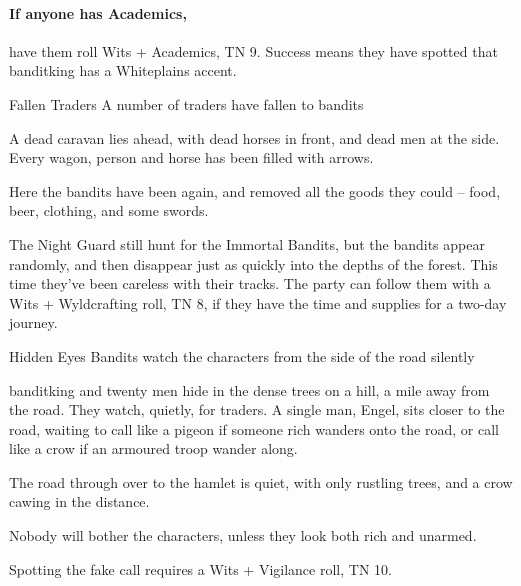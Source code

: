 \begin{multicols}{2}
\paragraph{If anyone has Academics,}
have them roll Wits + Academics, TN 9.
Success means they have spotted that \gls{banditking} has a Whiteplains accent.


\banditking


{Fallen Traders}%
{A number of traders have fallen to bandits}%

\begin{boxtext}

	A dead caravan lies ahead, with dead horses in front, and dead men at the side.  Every wagon, person and horse has been filled with arrows.

\end{boxtext}

Here the bandits have been again, and removed all the goods they could -- food, beer, clothing, and some swords.

The Night Guard still hunt for the Immortal Bandits, but the bandits appear randomly, and then disappear just as quickly into the depths of the forest.
This time they've been careless with their tracks.
The party can follow them with a Wits + Wyldcrafting roll, TN 8, if they have the time and supplies for a two-day journey.

{Hidden Eyes}%
{Bandits watch the characters from the side of the road silently}%

\gls{banditking} and twenty men hide in the dense trees on a hill, a mile away from the road.
They watch, quietly, for traders.
A single man, Engel, sits closer to the road, waiting to call like a pigeon if someone rich wanders onto the road, or call like a crow if an armoured troop wander along.

\begin{boxtext}

	The road through over to the hamlet is quiet, with only rustling trees, and a crow cawing in the distance.

\end{boxtext}

Nobody will bother the characters, unless they look both rich and unarmed.

Spotting the fake call requires a Wits + Vigilance roll, TN 10.


\end{multicols}
